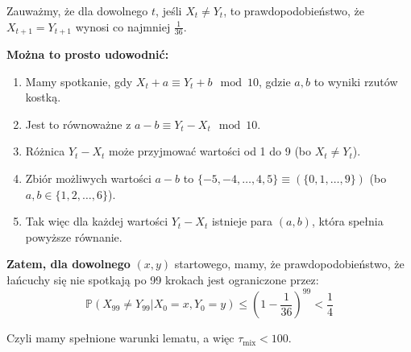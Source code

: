 Zauważmy, że dla dowolnego \(t\), jeśli \(X_t \neq Y_t\), to prawdopodobieństwo, że \(X_{t+1} = Y_{t+1}\) wynosi co najmniej \(\frac{1}{36}\).

\textbf{Można to prosto udowodnić:}
\begin{enumerate}
	\item Mamy spotkanie, gdy \(X_t + a \equiv Y_t + b \mod 10\), gdzie \(a, b\) to wyniki rzutów kostką.
	\item Jest to równoważne z \(a - b \equiv Y_t - X_t \mod 10\).
	\item Różnica \(Y_t - X_t\) może przyjmować wartości od 1 do 9 (bo \(X_t \neq Y_t\)).
	\item Zbiór możliwych wartości \(a - b\) to \(\{-5, -4, \ldots, 4, 5\} \equiv (\{ 0, 1, \ldots, 9 \})\) (bo \(a, b \in \{1, 2, \ldots, 6\}\)).
	\item Tak więc dla każdej wartości \(Y_t - X_t\) istnieje para \((a, b)\), która spełnia powyższe równanie.
\end{enumerate}

\textbf{Zatem, dla dowolnego} \((x, y)\) startowego, mamy, że prawdopodobieństwo, że łańcuchy się nie spotkają po 99 krokach jest ograniczone przez:
\[\mathbb{P}(X_{99} \neq Y_{99} | X_0 = x, Y_0 = y) \leq (1 - \frac{1}{36})^{99} < \frac{1}{4}\]

Czyli mamy spełnione warunki lematu, a więc \(\tau_{\text{mix}} < 100\).
